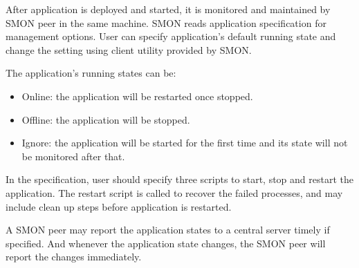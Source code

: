 

After application is deployed and started, it is monitored
and maintained by SMON peer in the same machine. SMON reads
application specification for management options. User can
specify application's default running state and change the
setting using client utility provided by SMON.

The application's running states can be:

\begin{itemize}
  \item Online: the application will be restarted once
  stopped.
  \item Offline: the application will be stopped.
  \item Ignore: the application will be started for the
  first time and its state will not be monitored after
  that.
\end{itemize}

In the specification, user should specify three scripts to
start, stop and restart the application. The restart script
is called to recover the failed processes, and may include
clean up steps before application is restarted.

A SMON peer may report the application states to a central
server timely if specified. And whenever the application
state changes, the SMON peer will report the changes
immediately.


%
%
%

